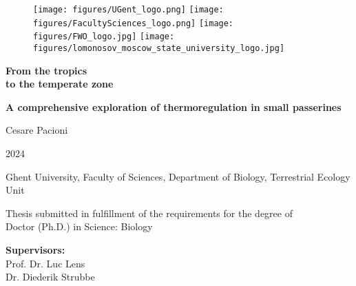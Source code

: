 \documentclass[10pt, twoside]{book} %
\begin{document}
	
	\newpage{\thispagestyle{empty}\cleardoublepage}
	\color{black}
	\newpage 
	\thispagestyle{empty}
\begin{center}
			\thispagestyle{empty}
			
			\begin{figure}[h!]
				\centering
				\texttt{[image: figures/UGent\_logo.png]}\hfill
				\texttt{[image: figures/FacultySciences\_logo.png]}\hfill
				\texttt{[image: figures/FWO\_logo.jpg]}\hfill
				\texttt{[image: figures/lomonosov\_moscow\_state\_university\_logo.jpg]}
				\end{figure}
			
			\vspace*{2.50cm}
			
			  {\centering \huge \textbf{From the tropics \\ to the temperate zone} \par}
        \vspace{0.5cm}
        {\Large \textbf{A comprehensive exploration of thermoregulation in small passerines} \par}

			
			\vspace{2.5 cm}
			
			{\normalsize Cesare Pacioni} 
			
			\vspace{1.0 cm}
			
			{\normalsize 2024}	
			
			\vspace{1.0 cm}
			
			{\footnotesize Ghent University, Faculty of Sciences, Department of Biology, Terrestrial Ecology Unit}
			
			\vspace{0.5cm}
			
			{\footnotesize Thesis submitted in fulfillment of the requirements for the degree of\\
 			Doctor (Ph.D.) in Science: Biology}

\end{center}
\newpage
		
	\color{black}
	\newpage 
	\thispagestyle{empty}

		
	{\small \noindent \textbf{Supervisors:} \\
			\hspace{10mm}Prof. Dr. Luc Lens\\
			\hspace{10mm}Dr. Diederik Strubbe}\\
\end{document}
